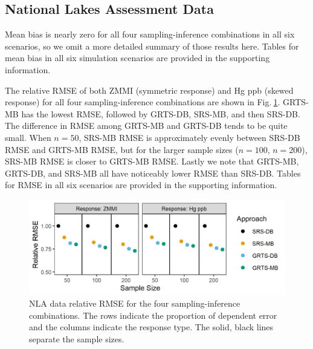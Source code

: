 \documentclass[]{elsarticle} %
\begin{document}
\hypertarget{sec:r_app}{%
\subsection{National Lakes Assessment Data}\label{sec:r_app}}

Mean bias is nearly zero for all four sampling-inference combinations in
all six scenarios, so we omit a more detailed summary of those results
here. Tables for mean bias in all six simulation scenarios are provided
in the supporting information.

The relative RMSE of both ZMMI (symmetric response) and Hg ppb (skewed
response) for all four sampling-inference combinations are shown in
Fig.\(~\)\ref{fig:data_rmspe_eff}. GRTS-MB has the lowest RMSE, followed
by GRTS-DB, SRS-MB, and then SRS-DB. The difference in RMSE among
GRTS-MB and GRTS-DB tends to be quite small. When \(n = 50\), SRS-MB
RMSE is approximately evenly between SRS-DB RMSE and GRTS-MB RMSE, but
for the larger sample sizes (\(n = 100\), \(n = 200\)), SRS-MB RMSE is
closer to GRTS-MB RMSE. Lastly we note that GRTS-MB, GRTS-DB, and SRS-MB
all have noticeably lower RMSE than SRS-DB. Tables for RMSE in all six
scenarios are provided in the supporting information.

\begin{figure}
  \centering
  \includegraphics[width = 1\linewidth]{figures/data_rmspe_eff.jpeg}
  \caption{NLA data relative RMSE for the four sampling-inference combinations. The rows indicate the proportion of dependent error and the columns indicate the response type. The solid, black lines separate the sample sizes.}
  \label{fig:data_rmspe_eff}
\end{figure}
\end{document}
